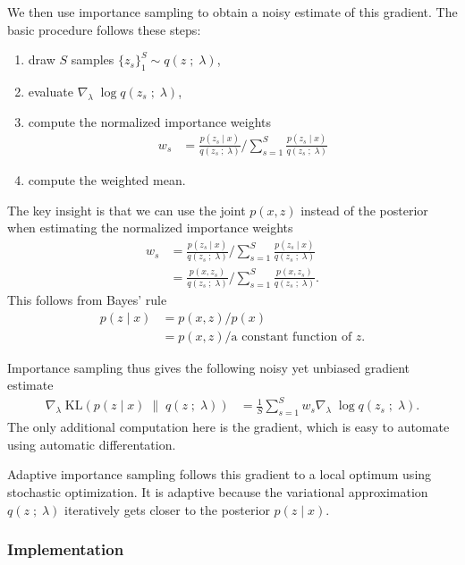 We then use importance sampling to obtain a noisy estimate of this gradient.
The basic procedure follows these steps:
\begin{enumerate}
  \item draw $S$ samples $\{z_s\}_1^S \sim q(z\;;\;\lambda)$,
  \item evaluate $\nabla_\lambda\; \log q(z_s\;;\;\lambda)$,
  \item compute the normalized importance weights
  \begin{align*}
    w_s
    &=
    \frac{p(z_s \mid x)}{q(z_s\;;\;\lambda)} 
    \Bigg/ 
    \sum_{s=1}^{S}
    \frac{p(z_s \mid x)}{q(z_s\;;\;\lambda)} 
  \end{align*}
  \item compute the weighted mean.
\end{enumerate}
The key insight is that we can use the joint $p(x,z)$ instead of the posterior
when estimating the normalized importance weights
\begin{align*}
  w_s
  &=
  \frac{p(z_s \mid x)}{q(z_s\;;\;\lambda)} 
  \Bigg/ 
  \sum_{s=1}^{S}
  \frac{p(z_s \mid x)}{q(z_s\;;\;\lambda)} \\
  &=
  \frac{p(x, z_s)}{q(z_s\;;\;\lambda)} 
  \Bigg/ 
  \sum_{s=1}^{S}
  \frac{p(x, z_s)}{q(z_s\;;\;\lambda)}.
\end{align*}
This follows from Bayes' rule
\begin{align*}
  p(z \mid x)
  &=
  p(x, z) / p(x)\\
  &=
  p(x, z) / \text{a constant function of }z.
\end{align*}

Importance sampling thus gives the following noisy yet unbiased gradient
estimate
\begin{align*}
\nabla_\lambda\;
  \text{KL}( 
  p(z \mid x)
  \;\|\;
  q(z\;;\;\lambda)
  )
  &=
  \frac{1}{S}
  \sum_{s=1}^S
  w_s
  \nabla_\lambda\; \log q(z_s\;;\;\lambda).
\end{align*}
The only additional computation here is the gradient, which is easy to automate
using automatic differentation.

Adaptive importance sampling follows this gradient to a local optimum using
stochastic optimization. It is adaptive because the variational approximation
$q(z\;;\;\lambda)$ iteratively gets closer to the posterior $p(z \mid x)$.

\subsubsection{Implementation}

